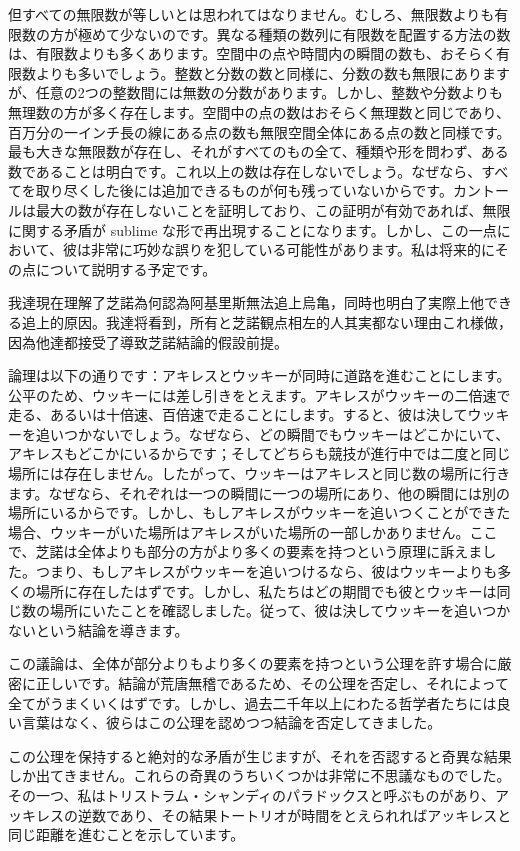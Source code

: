 \documentclass[a4paper,11pt,openany]{ltjsbook}
\begin{document}
但すべての無限数が等しいとは思われてはなりません。むしろ、無限数よりも有限数の方が極めて少ないのです。異なる種類の数列に有限数を配置する方法の数は、有限数よりも多くあります。空間中の点や時間内の瞬間の数も、おそらく有限数よりも多いでしょう。整数と分数の数と同様に、分数の数も無限にありますが、任意の2つの整数間には無数の分数があります。しかし、整数や分数よりも無理数の方が多く存在します。空間中の点の数はおそらく無理数と同じであり、百万分の一インチ長の線にある点の数も無限空間全体にある点の数と同様です。最も大きな無限数が存在し、それがすべてのもの全て、種類や形を問わず、ある数であることは明白です。これ以上の数は存在しないでしょう。なぜなら、すべてを取り尽くした後には追加できるものが何も残っていないからです。カントールは最大の数が存在しないことを証明しており、この証明が有効であれば、無限に関する矛盾が sublime な形で再出現することになります。しかし、この一点において、彼は非常に巧妙な誤りを犯している可能性があります。私は将来的にその点について説明する予定です。

我達現在理解了芝諾為何認為阿基里斯無法追上烏亀，同時也明白了実際上他できる追上的原因。我達将看到，所有と芝諾観点相左的人其実都ない理由これ様做，因為他達都接受了導致芝諾結論的假設前提。

論理は以下の通りです：アキレスとウッキーが同時に道路を進むことにします。公平のため、ウッキーには差し引きをとえます。アキレスがウッキーの二倍速で走る、あるいは十倍速、百倍速で走ることにします。すると、彼は決してウッキーを追いつかないでしょう。なぜなら、どの瞬間でもウッキーはどこかにいて、アキレスもどこかにいるからです；そしてどちらも競技が進行中では二度と同じ場所には存在しません。したがって、ウッキーはアキレスと同じ数の場所に行きます。なぜなら、それぞれは一つの瞬間に一つの場所にあり、他の瞬間には別の場所にいるからです。しかし、もしアキレスがウッキーを追いつくことができた場合、ウッキーがいた場所はアキレスがいた場所の一部しかありません。ここで、芝諾は全体よりも部分の方がより多くの要素を持つという原理に訴えました。つまり、もしアキレスがウッキーを追いつけるなら、彼はウッキーよりも多くの場所に存在したはずです。しかし、私たちはどの期間でも彼とウッキーは同じ数の場所にいたことを確認しました。従って、彼は決してウッキーを追いつかないという結論を導きます。

この議論は、全体が部分よりもより多くの要素を持つという公理を許す場合に厳密に正しいです。結論が荒唐無稽であるため、その公理を否定し、それによって全てがうまくいくはずです。しかし、過去二千年以上にわたる哲学者たちには良い言葉はなく、彼らはこの公理を認めつつ結論を否定してきました。

この公理を保持すると絶対的な矛盾が生じますが、それを否認すると奇異な結果しか出てきません。これらの奇異のうちいくつかは非常に不思議なものでした。その一つ、私はトリストラム・シャンディのパラドックスと呼ぶものがあり、アッキレスの逆数であり、その結果トートリオが時間をとえられればアッキレスと同じ距離を進むことを示しています。
\end{document}
